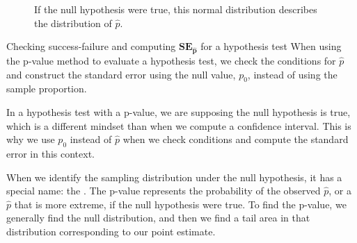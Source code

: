 \begin{figure}[h]
  \centering
  \caption{
      If the null hypothesis were true,
      this normal distribution describes the
      distribution of $\hat{p}$.}
  \label{normal_dist_mean_500_se_016}
\end{figure}

\begin{onebox}{Checking success-failure and computing
      $\mathbf{SE_{\hat{p}}}$
      for a hypothesis test}
  When using the p-value method to evaluate a hypothesis test,
  we check the conditions for $\hat{p}$ and construct the
  standard error using the null value, $p_0$, instead of using
  the sample proportion. \stdvspace{}

  In a hypothesis test with a p-value, we are supposing the
  null hypothesis is true,
  which is a different mindset than when we compute
  a confidence interval.
  This is why we use $p_0$ instead of $\hat{p}$
  when we check conditions and compute the standard error
  in this context.
\end{onebox}

When we identify the sampling distribution under the null hypothesis,
it has a special name: the .
The p-value represents the probability of the observed $\hat{p}$,
or a $\hat{p}$ that is more extreme,
if the null hypothesis were true.
To find the p-value, we generally find the null distribution,
and then we find a tail area in that distribution corresponding
to our point estimate.

